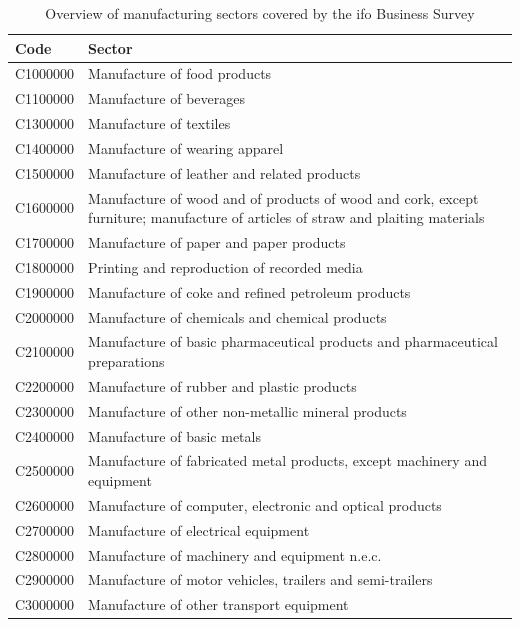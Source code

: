 \begin{table}[H]
    \centering
    \small
    \begin{tabularx}{\textwidth}{lX}
        \toprule
        \textbf{Code} & \textbf{Sector} \\
        \midrule
        C1000000 & Manufacture of food products \\
        C1100000 & Manufacture of beverages \\
        C1300000 & Manufacture of textiles \\
        C1400000 & Manufacture of wearing apparel \\
        C1500000 & Manufacture of leather and related products \\
        C1600000 & Manufacture of wood and of products of wood and cork, except furniture; manufacture of articles of straw and plaiting materials \\
        C1700000 & Manufacture of paper and paper products \\
        C1800000 & Printing and reproduction of recorded media \\
        C1900000 & Manufacture of coke and refined petroleum products \\
        C2000000 & Manufacture of chemicals and chemical products \\
        C2100000 & Manufacture of basic pharmaceutical products and pharmaceutical preparations \\
        C2200000 & Manufacture of rubber and plastic products \\
        C2300000 & Manufacture of other non-metallic mineral products \\
        C2400000 & Manufacture of basic metals \\
        C2500000 & Manufacture of fabricated metal products, except machinery and equipment \\
        C2600000 & Manufacture of computer, electronic and optical products \\
        C2700000 & Manufacture of electrical equipment \\
        C2800000 & Manufacture of machinery and equipment n.e.c. \\
        C2900000 & Manufacture of motor vehicles, trailers and semi-trailers \\
        C3000000 & Manufacture of other transport equipment \\
        \bottomrule
    \end{tabularx}
    \caption{Overview of manufacturing sectors covered by the ifo Business Survey}
    \label{tab:sectors}
\end{table}

